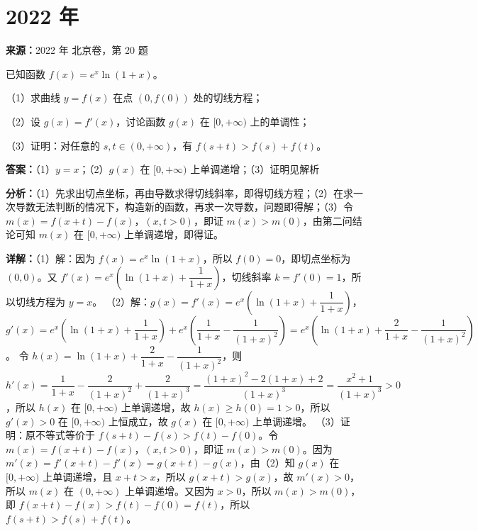 \section*{2022 年}

\begin{question}[points=15]
\textbf{来源：}2022 年 北京卷，第 20 题\par
已知函数 $f(x) = e^x \ln(1+x)$。

（1）求曲线 $y=f(x)$ 在点 $(0,f(0))$ 处的切线方程；

（2）设 $g(x)=f'(x)$，讨论函数 $g(x)$ 在 $[0,+\infty)$ 上的单调性；

（3）证明：对任意的 $s,t\in (0,+\infty)$，有 $f(s+t) > f(s)+f(t)$。
\begin{solution}
\textbf{答案：}（1）$y=x$；（2）$g(x)$ 在 $[0,+\infty)$ 上单调递增；（3）证明见解析

\textbf{分析：}（1）先求出切点坐标，再由导数求得切线斜率，即得切线方程；（2）在求一次导数无法判断的情况下，构造新的函数，再求一次导数，问题即得解；（3）令 $m(x)=f(x+t)-f(x)$，$(x,t>0)$，即证 $m(x)>m(0)$，由第二问结论可知 $m(x)$ 在 $[0,+\infty)$ 上单调递增，即得证。

\textbf{详解：}（1）解：因为 $f(x)=e^x\ln(1+x)$，所以 $f(0)=0$，即切点坐标为 $(0,0)$。又 $f'(x)=e^x\left(\ln(1+x)+\dfrac{1}{1+x}\right)$，切线斜率 $k=f'(0)=1$，所以切线方程为 $y=x$。
（2）解：$g(x)=f'(x)=e^x\left(\ln(1+x)+\dfrac{1}{1+x}\right)$，$g'(x)=e^x\left(\ln(1+x)+\dfrac{1}{1+x}\right)+e^x\left(\dfrac{1}{1+x}-\dfrac{1}{(1+x)^2}\right)=e^x\left(\ln(1+x)+\dfrac{2}{1+x}-\dfrac{1}{(1+x)^2}\right)$。
令 $h(x)=\ln(1+x)+\dfrac{2}{1+x}-\dfrac{1}{(1+x)^2}$，则 $h'(x)=\dfrac{1}{1+x}-\dfrac{2}{(1+x)^2}+\dfrac{2}{(1+x)^3}=\dfrac{(1+x)^2-2(1+x)+2}{(1+x)^3}=\dfrac{x^2+1}{(1+x)^3}>0$，所以 $h(x)$ 在 $[0,+\infty)$ 上单调递增，故 $h(x)\ge h(0)=1>0$，所以 $g'(x)>0$ 在 $[0,+\infty)$ 上恒成立，故 $g(x)$ 在 $[0,+\infty)$ 上单调递增。
（3）证明：原不等式等价于 $f(s+t)-f(s)>f(t)-f(0)$。令 $m(x)=f(x+t)-f(x)$，$(x,t>0)$，即证 $m(x)>m(0)$。因为 $m'(x)=f'(x+t)-f'(x)=g(x+t)-g(x)$，由（2）知 $g(x)$ 在 $[0,+\infty)$ 上单调递增，且 $x+t>x$，所以 $g(x+t)>g(x)$，故 $m'(x)>0$，所以 $m(x)$ 在 $(0,+\infty)$ 上单调递增。又因为 $x>0$，所以 $m(x)>m(0)$，即 $f(x+t)-f(x)>f(t)-f(0)=f(t)$，所以 $f(s+t)>f(s)+f(t)$。
\end{solution}
\end{question}

